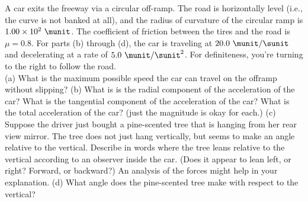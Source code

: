 A car exits the freeway via a circular off-ramp. The road is
horizontally level (i.e., the curve is not banked at all), and the
radius of curvature of the circular ramp is $1.00 \times 10^2\ \munit$.
The coefficient of friction between the tires and the road is
$\mu = 0.8$. For parts (b) through (d), the car is traveling at
$20.0\ \munit/\sunit$ and decelerating at a rate of 
$5.0\ \munit/\sunit^2$. For definiteness, you're turning to the right to
follow the road.\\
%
(a) What is the maximum possible speed the car can travel on the
offramp without slipping?\hwendpart
%
(b) What is is the radial component of the acceleration of the car?
What is the tangential component of the acceleration of the car? What
is the total acceleration of the car? (just the magnitude is okay for
each.)\hwendpart
%
(c) Suppose the driver just bought a pine-scented tree that is hanging
from her rear view mirror. The tree does not just hang vertically,
but seems to make an angle relative to the vertical. Describe in
words where the tree leans relative to the vertical according to an
observer inside the car. (Does it appear to lean left, or right?
Forward, or backward?) An analysis of the forces might help in your explanation.\hwendpart
%
(d) What angle does the pine-scented tree make with respect to the
vertical?
